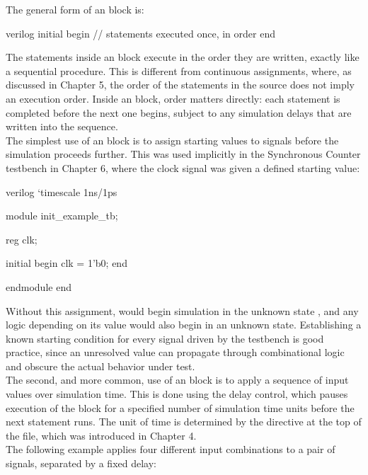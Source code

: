 The general form of an  block is:
\begin{codeblock}{verilog}
initial begin
    // statements executed once, in order
end
\end{codeblock}

The statements inside an  block execute in the order they are written, exactly like a sequential procedure. This is different from continuous assignments, where, as discussed in Chapter 5, the order of the statements in the source does not imply an execution order. Inside an  block, order matters directly: each statement is completed before the next one begins, subject to any simulation delays that are written into the sequence. \\


The simplest use of an  block is to assign starting values to signals before the simulation proceeds further. This was used implicitly in the Synchronous Counter testbench in Chapter 6, where the clock signal was given a defined starting value:

\begin{codeblock}{verilog}
`timescale 1ns/1ps

module init_example_tb;

    reg clk;

    initial begin
        clk = 1'b0;
    end

endmodule
end
\end{codeblock}

Without this assignment,  would begin simulation in the unknown state , and any logic depending on its value would also begin in an unknown state. Establishing a known starting condition for every signal driven by the testbench is good practice, since an unresolved  value can propagate through combinational logic and obscure the actual behavior under test. \\

The second, and more common, use of an  block is to apply a sequence of input values over simulation time. This is done using the \inlinecode{#} delay control, which pauses execution of the block for a specified number of simulation time units before the next statement runs. The unit of time is determined by the  directive at the top of the file, which was introduced in Chapter 4. \\


The following example applies four different input combinations to a pair of signals, separated by a fixed delay:

